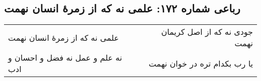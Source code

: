 \begin{center}
\section*{رباعی شماره ۱۷۲: علمی نه که از زمرهٔ انسان نهمت}
\label{sec:sh172}
\begin{longtable}{l p{0.5cm} r}
علمی نه که از زمرهٔ انسان نهمت
&&
جودی نه که از اصل کریمان نهمت
\\
نه علم و عمل نه فضل و احسان و ادب
&&
یا رب بکدام تره در خوان نهمت
\\
\end{longtable}
\end{center}
